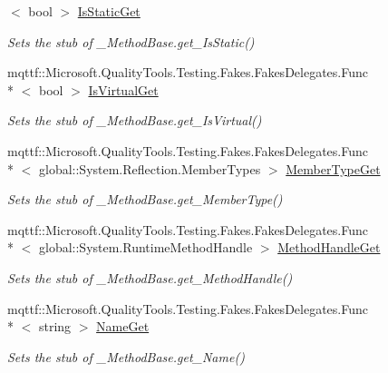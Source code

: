 \begin{DoxyCompactItemize}
$<$ bool $>$ \hyperlink{class_system_1_1_runtime_1_1_interop_services_1_1_fakes_1_1_stub___method_base_a9942d1453cbd6e098362d18e13d050f5}{Is\-Static\-Get}
\begin{DoxyCompactList}\small\item\em Sets the stub of \-\_\-\-Method\-Base.\-get\-\_\-\-Is\-Static()\end{DoxyCompactList}\item 
mqttf\-::\-Microsoft.\-Quality\-Tools.\-Testing.\-Fakes.\-Fakes\-Delegates.\-Func\\*
$<$ bool $>$ \hyperlink{class_system_1_1_runtime_1_1_interop_services_1_1_fakes_1_1_stub___method_base_a7eb863eb321fd42222014dd6570e71dd}{Is\-Virtual\-Get}
\begin{DoxyCompactList}\small\item\em Sets the stub of \-\_\-\-Method\-Base.\-get\-\_\-\-Is\-Virtual()\end{DoxyCompactList}\item 
mqttf\-::\-Microsoft.\-Quality\-Tools.\-Testing.\-Fakes.\-Fakes\-Delegates.\-Func\\*
$<$ global\-::\-System.\-Reflection.\-Member\-Types $>$ \hyperlink{class_system_1_1_runtime_1_1_interop_services_1_1_fakes_1_1_stub___method_base_acb636e0afdd7a54880837e2d1bf7d725}{Member\-Type\-Get}
\begin{DoxyCompactList}\small\item\em Sets the stub of \-\_\-\-Method\-Base.\-get\-\_\-\-Member\-Type()\end{DoxyCompactList}\item 
mqttf\-::\-Microsoft.\-Quality\-Tools.\-Testing.\-Fakes.\-Fakes\-Delegates.\-Func\\*
$<$ global\-::\-System.\-Runtime\-Method\-Handle $>$ \hyperlink{class_system_1_1_runtime_1_1_interop_services_1_1_fakes_1_1_stub___method_base_a5881fc1eae5cc7013eaaa3f69714cce9}{Method\-Handle\-Get}
\begin{DoxyCompactList}\small\item\em Sets the stub of \-\_\-\-Method\-Base.\-get\-\_\-\-Method\-Handle()\end{DoxyCompactList}\item 
mqttf\-::\-Microsoft.\-Quality\-Tools.\-Testing.\-Fakes.\-Fakes\-Delegates.\-Func\\*
$<$ string $>$ \hyperlink{class_system_1_1_runtime_1_1_interop_services_1_1_fakes_1_1_stub___method_base_a274514eb4c0588060cd01f3821f6d482}{Name\-Get}
\begin{DoxyCompactList}\small\item\em Sets the stub of \-\_\-\-Method\-Base.\-get\-\_\-\-Name()\end{DoxyCompactList}\item 

\end{DoxyCompactItemize}
